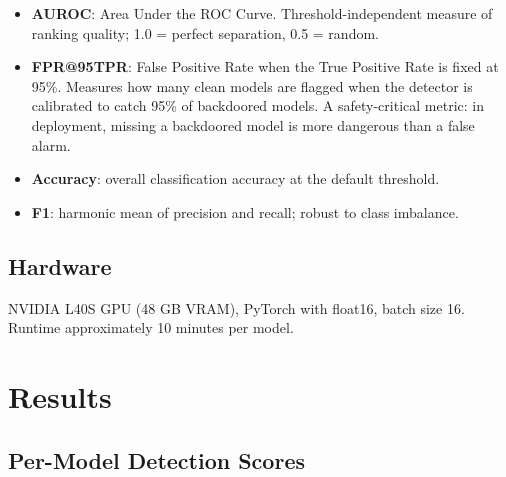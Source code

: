 \documentclass[11pt,a4paper]{article}
\begin{document}
\begin{itemize}[nosep]
  \item \textbf{AUROC}: Area Under the ROC Curve. Threshold-independent measure
    of ranking quality; 1.0 = perfect separation, 0.5 = random.
  \item \textbf{FPR@95TPR}: False Positive Rate when the True Positive Rate is
    fixed at 95\%. Measures how many clean models are flagged when the detector
    is calibrated to catch 95\% of backdoored models. A safety-critical metric:
    in deployment, missing a backdoored model is more dangerous than a false alarm.
  \item \textbf{Accuracy}: overall classification accuracy at the default threshold.
  \item \textbf{F1}: harmonic mean of precision and recall; robust to class imbalance.
\end{itemize}

\subsection{Hardware}

NVIDIA L40S GPU (48 GB VRAM), PyTorch with float16, batch size 16. Runtime
approximately 10 minutes per model.

\section{Results}

\subsection{Per-Model Detection Scores}
\end{document}
